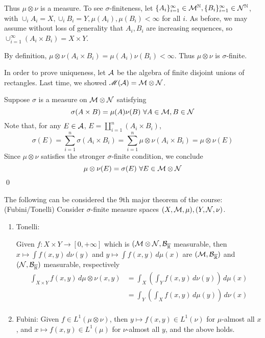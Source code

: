 \documentclass[x11names,reqno,14pt]{extarticle}
\newcommand*{\oo}{\infty}
\newcommand{\seq}[1]{_{#1 = 1}^\oo}
\begin{document}
Thus $\mu\otimes\nu$ is a measure. To see $\sigma$-finiteness, let $\{A_i\}\seq{i} \in \mc{M}^\N, \{B_i\}\seq{i}\in\mc{N}^\N$, with $\cup_iA_i = X, \cup_iB_i = Y, \mu(A_i), \mu(B_i)< \oo$ for all $i$. As before, we may assume without loss of generality that $A_i, B_i$ are increasing sequences, so $\cup\seq{i}(A_i\times B_i) = X\times Y$. 

By definition, $\mu\otimes\nu(A_i\times B_i) = \mu(A_i)\nu(B_i)<\oo$. Thus $\mu\otimes\nu$ is $\sigma$-finite. 

In order to prove uniqueness, let $\mathcal{A}$ be the algebra of finite disjoint unions of rectangles. Last time, we showed $\mathscr{M}(\mathcal{A}) = \mathcal{M}\otimes\mathcal{N}$. 

Suppose $\sigma$ is a measure on $\mathcal{M}\otimes\mathcal{N}$ satisfying
\[
\sigma(A\times B) = \mu(A)\nu(B)\,\,\forall A \in \mathcal{M}, B \in \mathcal{N}
\]
Note that, for any $E \in \mathcal{A}$, $E = \coprod_{i=1}^n(A_i\times B_i)$, 
\[
\sigma(E) = \sum_{i=1}^n\sigma(A_i\times B_i) = \sum_{i=1}^n\mu\otimes\nu(A_i \times B_i) = \mu\otimes\nu(E)
\]
Since $\mu\otimes \nu$ satisfies the stronger $\sigma$-finite condition, we conclude 
\[
\mu\otimes\nu(E) = \sigma(E)\,\,\forall E \in \mathcal{M}\otimes\mathcal{N}
\]
\qed

The following can be considered the 9th major theorem of the course: 
\thm (Fubini/Tonelli) 
Consider $\sigma$-finite measure spaces $(X,\mathcal{M},\mu), (Y,\mathcal{N},\nu)$. 
\begin{enumerate}[label=(\roman*)]
\item Tonelli: 

Given $f:X\times Y\to[0, +\oo]$ which is $(\mathcal{M}\otimes\mathcal{N}, \mathcal{B}_{\overline{\mathbb{R}}}$ measurable, then $x\mapsto\int f(x, y)\,d\nu(y)$ and $y\mapsto\int f(x, y)\,d\mu(x)$ are $(\mathcal{M},\mathcal{B}_{\overline{\mathbb{R}}})$ and $(\mathcal{N}, \mathcal{B}_{\overline{\mathbb{R}}})$ measurable, respectively
\begin{align*}
\int_{X\times Y}f(x, y)\,d\mu\otimes\nu(x, y) & = \int_X\left(\int_Yf(x, y)\,d\nu(y)\right)\,d\mu(x) \\
& = \int_Y\left(\int_Xf(x, y)\,d\mu(y)\right)\,d\nu(x) \\
\end{align*}

\item Fubini:
Given $f\in L^1(\mu\otimes\nu)$, then $y\mapsto f(x, y) \in L^1(\nu)$ for $\mu$-almost all $x$, and $x\mapsto f(x, y) \in L^1(\mu)$ for $\nu$-almost all $y$, and the above holds. 

\end{enumerate}
\end{document}
